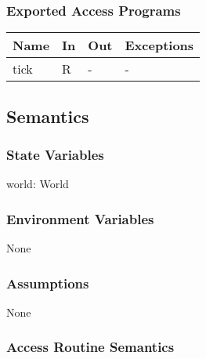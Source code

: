 \documentclass[12pt, titlepage]{article}
\begin{document}
\subsubsection{Exported Access Programs}

\begin{center}
\begin{tabular}{p{2cm} p{4cm} p{4cm} p{2cm}}
\hline
\textbf{Name} & \textbf{In} & \textbf{Out} & \textbf{Exceptions} \\
\hline
tick & R & - & - \\
\hline
\end{tabular}
\end{center}

\subsection{Semantics}

\subsubsection{State Variables}

world: World


\subsubsection{Environment Variables}

None

\subsubsection{Assumptions}

None

\subsubsection{Access Routine Semantics}
\end{document}
